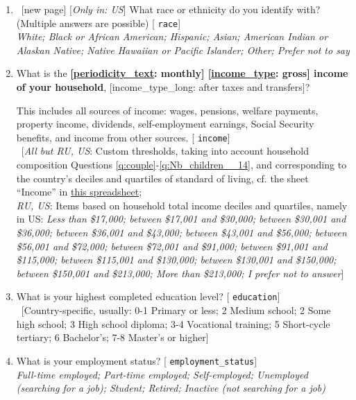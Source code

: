 \begin{enumerate}[resume]
\item ~[new page] \label{q:race} [\textit{Only in: US}] What race or ethnicity do you identify with? (Multiple answers are possible) [%
\verb|race|]
  \\ \textit{White; Black or African American; Hispanic; Asian; American Indian or Alaskan Native; Native Hawaiian or Pacific Islander; Other; Prefer not to say}

\item  \label{q:income} What is the \textbf{[\hyperlink{tab_features}{periodicity\_text}: monthly] [\hyperlink{tab_features}{income\_type}: gross] income of your household}, [income\_type\_long: after taxes and transfers]?

This includes all sources of income: wages, pensions, welfare payments, property income, dividends, self-employment earnings, Social Security benefits, and income from other sources. [%
\verb|income|]
  \\ ~[\textit{All but RU, US}: Custom thresholds, taking into account household composition Questions \ref{q:couple}-\ref{q:Nb_children__14}, and corresponding to the country's deciles and quartiles of standard of living, cf. the sheet ``Income'' in \href{https://github.com/bixiou/robustness_global_redistr/raw/main/questionnaire/source.xlsx}{this spreadsheet}; \\ \textit{RU, US}: Items based on household total income deciles and quartiles, namely in US: \textit{Less than \$17,000; between \$17,001 and \$30,000; between \$30,001 and \$36,000; between \$36,001 and \$43,000; between \$43,001 and \$56,000; between \$56,001 and \$72,000; between \$72,001 and \$91,000; between \$91,001 and \$115,000; between \$115,001 and \$130,000; between \$130,001 and \$150,000; between \$150,001 and \$213,000; More than \$213,000; I prefer not to answer}]

\item  \label{q:education} What is your highest completed education level? [%
\verb|education|]
  \\ ~[Country-specific, usually: 0-1 Primary or less; 2 Medium school; 2 Some high school; 3 High school diploma; 3-4 Vocational training; 5 Short-cycle tertiary; 6 Bachelor's; 7-8 Master's or higher]

\item  \label{q:employment_status} What is your employment status? [%
\verb|employment_status|]
  \\ \textit{Full-time employed; Part-time employed; Self-employed; Unemployed (searching for a job); Student; Retired; Inactive (not searching for a job)}


\end{enumerate}

